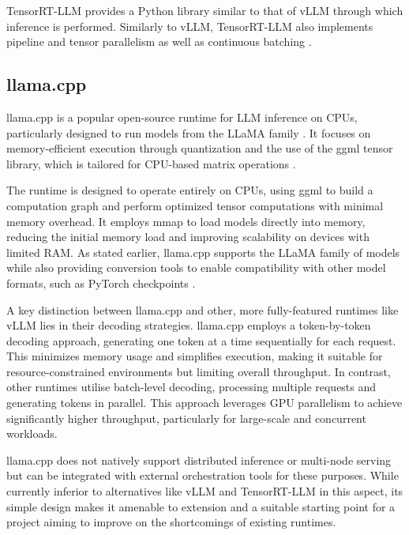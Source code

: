 \documentclass[12pt,twoside]{report}
\begin{document}
TensorRT-LLM provides a Python library similar to that of vLLM through which inference is performed.
Similarly to vLLM, TensorRT-LLM also implements pipeline and tensor parallelism as well as continuous batching \cite{nvidiainferencewhitepaper}.

\subsection{llama.cpp} \label{section:llamacpp}

llama.cpp is a popular open-source runtime for LLM inference on CPUs, particularly designed to run models from the LLaMA family \cite{touvron2023llama}. 
It focuses on memory-efficient execution through quantization and the use of the ggml tensor library, which is tailored for CPU-based matrix operations \cite{ggml}.

The runtime is designed to operate entirely on CPUs, using ggml to build a computation graph and perform optimized tensor computations with minimal memory overhead. 
It employs mmap to load models directly into memory, reducing the initial memory load and improving scalability on devices with limited RAM. 
As stated earlier, llama.cpp supports the LLaMA family of models while also providing conversion tools to enable compatibility with other model formats, such as PyTorch checkpoints \cite{paszke2019pytorch}.

A key distinction between llama.cpp and other, more fully-featured runtimes like vLLM lies in their decoding strategies. 
llama.cpp employs a token-by-token decoding approach, generating one token at a time sequentially for each request. 
This minimizes memory usage and simplifies execution, making it suitable for resource-constrained environments but limiting overall throughput.
In contrast, other runtimes utilise batch-level decoding, processing multiple requests and generating tokens in parallel.
This approach leverages GPU parallelism to achieve significantly higher throughput, particularly for large-scale and concurrent workloads.

llama.cpp does not natively support distributed inference or multi-node serving but can be integrated with external orchestration tools \cite{ray} for these purposes.
While currently inferior to alternatives like vLLM and TensorRT-LLM in this aspect, its simple design makes it amenable to extension and a suitable starting point for a project aiming to improve on the shortcomings of existing runtimes.
\end{document}
